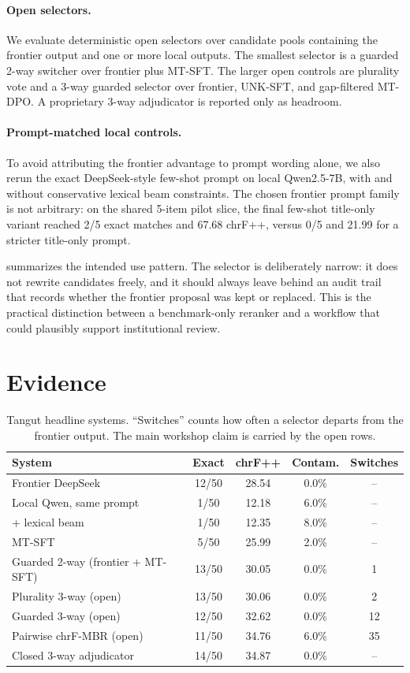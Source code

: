 \documentclass{article}
\begin{document}
\paragraph{Open selectors.} We evaluate deterministic open selectors over candidate pools containing the frontier output and one or more local outputs. The smallest selector is a guarded 2-way switcher over frontier plus MT-SFT. The larger open controls are plurality vote and a 3-way guarded selector over frontier, UNK-SFT, and gap-filtered MT-DPO. A proprietary 3-way adjudicator is reported only as headroom.

\paragraph{Prompt-matched local controls.} To avoid attributing the frontier advantage to prompt wording alone, we also rerun the exact DeepSeek-style few-shot prompt on local Qwen2.5-7B, with and without conservative lexical beam constraints. The chosen frontier prompt family is not arbitrary: on the shared 5-item pilot slice, the final few-shot title-only variant reached 2/5 exact matches and 67.68 chrF++, versus 0/5 and 21.99 for a stricter title-only prompt.

 summarizes the intended use pattern. The selector is deliberately narrow: it does not rewrite candidates freely, and it should always leave behind an audit trail that records whether the frontier proposal was kept or replaced. This is the practical distinction between a benchmark-only reranker and a workflow that could plausibly support institutional review.

\section{Evidence}

\begin{table}[t]
\centering
\small
\begin{tabularx}{\columnwidth}{@{}>{\raggedright\arraybackslash}Xcccc@{}}
\toprule
System & Exact & chrF++ & Contam. & Switches \\
\midrule
Frontier DeepSeek & 12/50 & 28.54 & 0.0\% & -- \\
Local Qwen, same prompt & 1/50 & 12.18 & 6.0\% & -- \\
+ lexical beam & 1/50 & 12.35 & 8.0\% & -- \\
MT-SFT & 5/50 & 25.99 & 2.0\% & -- \\
Guarded 2-way (frontier + MT-SFT) & 13/50 & 30.05 & 0.0\% & 1 \\
Plurality 3-way (open) & 13/50 & 30.06 & 0.0\% & 2 \\
Guarded 3-way (open) & 12/50 & 32.62 & 0.0\% & 12 \\
Pairwise chrF-MBR (open) & 11/50 & 34.76 & 6.0\% & 35 \\
Closed 3-way adjudicator & 14/50 & 34.87 & 0.0\% & -- \\
\bottomrule
\end{tabularx}
\caption{Tangut headline systems. ``Switches'' counts how often a selector departs from the frontier output. The main workshop claim is carried by the open rows.}
\label{tab:tangut}
\end{table}
\end{document}
